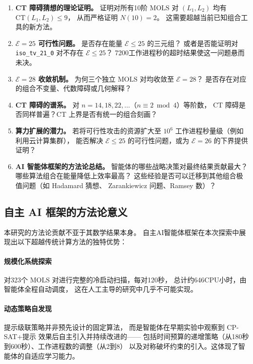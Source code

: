 \documentclass[11pt,a4paper]{ctexart}
\theoremstyle{remark}
\newcommand{\CT}{\mathrm{CT}}
\newcommand{\E}{\mathcal{E}}
\newcommand{\MOLS}{\mathrm{MOLS}}
\begin{document}
\begin{enumerate}[leftmargin=2.5em,label=\textbf{开放问题~\arabic*.}]
  \item \textbf{CT 障碍猜想的理论证明。}
    证明对所有10阶 $\MOLS$ 对 $(L_1, L_2)$ 均有 $\CT(L_1, L_2) \le 9$，
    从而严格证明 $N(10) = 2$。
    这需要超越当前已知组合工具的新方法。

  \item \textbf{$\E = 25$ 可行性问题。}
    是否存在能量 $\E \le 25$ 的三元组？
    或者是否能证明对 \texttt{iso\_tv\_21\_0} 对不存在 $\E \le 25$？
    7200工作进程秒的超时结果使这一问题悬而未决。

  \item \textbf{$\E = 28$ 收敛机制。}
    为何三个独立 $\MOLS$ 对均收敛至 $\E = 28$？
    是否存在对应的组合不变量、代数障碍或几何解释？

  \item \textbf{CT 障碍的谱系。}
    对 $n = 14, 18, 22, \ldots$（$n \equiv 2 \bmod 4$）等阶数，
    CT 障碍是否同样普遍？CT 上界是否有统一的组合刻画？

  \item \textbf{算力扩展的潜力。}
    若将可行性攻击的资源扩大至 $10^6$ 工作进程秒量级（例如利用云计算集群），
    能否解决 $\E \le 25$ 的可行性问题，或为 $\E = 26$ 的下界提供证明？

  \item \textbf{AI 智能体框架的方法论总结。}
    智能体的哪些战略决策对最终结果贡献最大？
    哪些算法组合在能量降低上效率最高？
    这些经验是否可以迁移到其他组合极值问题（如 Hadamard 猜想、
    Zarankiewicz 问题、Ramsey 数）？
\end{enumerate}

\subsection{自主 AI 框架的方法论意义}

本研究的方法论贡献不亚于其数学结果本身。
自主AI智能体框架在本次探索中展现出以下超越传统计算方法的独特优势：

\paragraph{规模化系统探索}
对323个 $\MOLS$ 对进行完整的冷启动扫描，每对120秒，
总计约646CPU小时，由智能体全程自动调度，
这在人工主导的研究中几乎不可能实现。

\paragraph{动态策略自发现}
提示级联策略并非预先设计的固定算法，
而是智能体在早期实验中观察到 CP-SAT+提示 效果后自主引入并持续改进的——
包括时间预算的递增策略（从180秒到600秒）、工作进程数的调整（从2到8）
以及对称破坏约束的引入。这体现了智能体的自适应学习能力。
\end{document}
